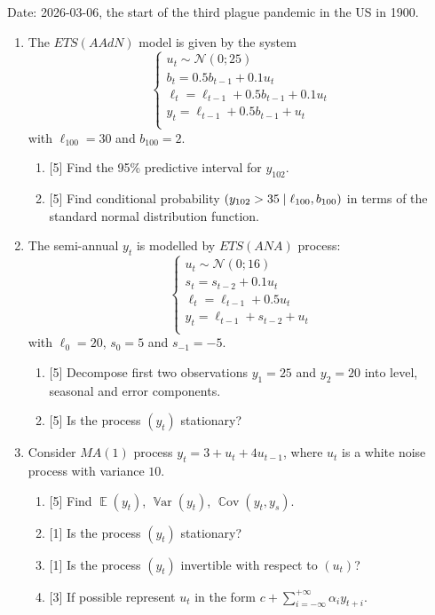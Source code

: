 \documentclass[12pt]{article}
\DeclareMathOperator{\Cov}{\mathbb{C}ov}
\DeclareMathOperator{\Var}{\mathbb{V}ar}
\let\P\relax
\DeclareMathOperator{\P}{\mathbb{P}}
\DeclareMathOperator{\E}{\mathbb{E}}
\newcommand{\cN}{\mathcal{N}}
\begin{document}

Date: 2026-03-06, the start of the third plague pandemic in the US in 1900.

\begin{enumerate}
\item   The $ETS(AAdN)$ model is given by the system
  \[
  \begin{cases}
  u_t  \sim \cN(0; 25) \\
  b_t = 0.5 b_{t-1} + 0.1 u_t \\
  \ell_t = \ell_{t-1} + 0.5 b_{t-1} + 0.1 u_t \\
  y_t = \ell_{t-1} + 0.5 b_{t-1} + u_t \\
  \end{cases}
  \]
  with $\ell_{100} = 30$ and $b_{100} = 2$.
\begin{enumerate}
  \item {[5]} Find the 95\% predictive interval for $y_{102}$.
  \item {[5]} Find conditional probability $\P(y_{102} > 35 \mid \ell_{100}, b_{100})$ in terms of the standard normal distribution function.
\end{enumerate}
\item   The semi-annual $y_t$ is modelled by $ETS(ANA)$ process:    
    \[
    \begin{cases}
        u_t \sim \cN(0; 16) \\
        s_t = s_{t-2} + 0.1 u_t \\
        \ell_t = \ell_{t-1}  + 0.5 u_t \\
        y_t = \ell_{t-1} + s_{t-2} + u_t \\
    \end{cases}    
    \]
with $\ell_0 = 20$, $s_0 = 5$ and $s_{-1} = -5$.

\begin{enumerate}
    \item {[5]} Decompose first two observations $y_1 = 25$ and $y_2 = 20$ into level, seasonal and error components.
    \item {[5]} Is the process $(y_t)$ stationary?
\end{enumerate}

\item Consider $MA(1)$ process $y_t = 3 + u_t + 4 u_{t-1}$, where $u_t$ is a white noise process with variance $10$.
\begin{enumerate}
    \item {[5]} Find $\E(y_t)$, $\Var(y_t)$, $\Cov(y_t, y_s)$.
    \item {[1]} Is the process $(y_t)$ stationary?
    \item {[1]} Is the process $(y_t)$  invertible with respect to $(u_t)$?
    \item {[3]} If possible represent $u_t$ in the form $c + \sum_{i=-\infty}^{+\infty} \alpha_i y_{t + i}$.
\end{enumerate}


\end{enumerate}
\end{document}
